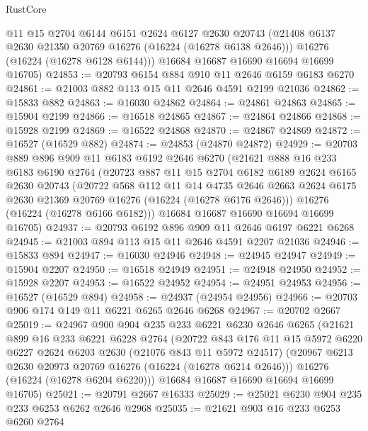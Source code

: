 \begin{lexlean}{RustCore}
\begin{coremodule}
        @11
        @15
        @2704
        @6144
        @6151
        @2624
        @6127
        @2630
        @20743
        (@21408 @6137 @2630 @21350 @20769 @16276 (@16224 (@16278 @6138 @2646)))
        @16276
        (@16224 (@16278 @6128 @6144)))
      @16684
      @16687
      @16690
      @16694
      @16699
      @16705)
@24853 := @20793 @6154 @884 @910 @11 @2646 @6159 @6183 @6270
@24861 := @21003 @882 @113 @15 @11 @2646 @4591 @2199 @21036
@24862 := @15833 @882
@24863 := @16030 @24862
@24864 := @24861 @24863
@24865 := @15904 @2199
@24866 := @16518 @24865
@24867 := @24864 @24866
@24868 := @15928 @2199
@24869 := @16522 @24868
@24870 := @24867 @24869
@24872 := @16527 (@16529 @882)
@24874 := @24853 (@24870 @24872)
@24929 := @20703
    @889
    @896
    @909
    @11
    @6183
    @6192
    @2646
    @6270
    (@21621
      @888
      @16
      @233
      @6183
      @6190
      @2764
      (@20723
        @887
        @11
        @15
        @2704
        @6182
        @6189
        @2624
        @6165
        @2630
        @20743
        (@20722
          @568
          @112
          @11
          @14
          @4735
          @2646
          @2663
          @2624
          @6175
          @2630
          @21369
          @20769
          @16276
          (@16224 (@16278 @6176 @2646)))
        @16276
        (@16224 (@16278 @6166 @6182)))
      @16684
      @16687
      @16690
      @16694
      @16699
      @16705)
@24937 := @20793 @6192 @896 @909 @11 @2646 @6197 @6221 @6268
@24945 := @21003 @894 @113 @15 @11 @2646 @4591 @2207 @21036
@24946 := @15833 @894
@24947 := @16030 @24946
@24948 := @24945 @24947
@24949 := @15904 @2207
@24950 := @16518 @24949
@24951 := @24948 @24950
@24952 := @15928 @2207
@24953 := @16522 @24952
@24954 := @24951 @24953
@24956 := @16527 (@16529 @894)
@24958 := @24937 (@24954 @24956)
@24966 := @20703 @906 @174 @149 @11 @6221 @6265 @2646 @6268
@24967 := @20702 @2667
@25019 := @24967
    @900
    @904
    @235
    @233
    @6221
    @6230
    @2646
    @6265
    (@21621
      @899
      @16
      @233
      @6221
      @6228
      @2764
      (@20722
        @843
        @176
        @11
        @15
        @5972
        @6220
        @6227
        @2624
        @6203
        @2630
        (@21076 @843 @11 @5972 @24517)
        (@20967 @6213 @2630 @20973 @20769 @16276 (@16224 (@16278 @6214 @2646)))
        @16276
        (@16224 (@16278 @6204 @6220)))
      @16684
      @16687
      @16690
      @16694
      @16699
      @16705)
@25021 := @20791 @2667 @16333
@25029 := @25021 @6230 @904 @235 @233 @6253 @6262 @2646 @2968
@25035 := @21621 @903 @16 @233 @6253 @6260 @2764

\end{coremodule}
\end{lexlean}
